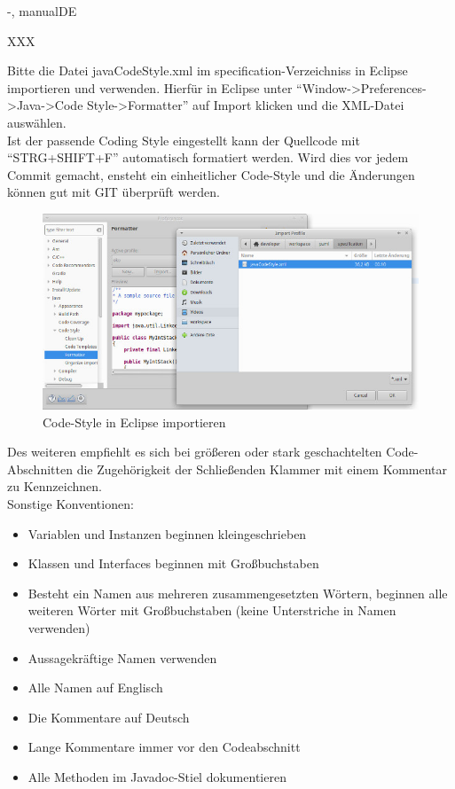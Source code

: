 \documentclass[twoside]{report}
\begin{document}
\begin{shownto}{-, manualDE}


XXX
\nsecend

Bitte die Datei javaCodeStyle.xml im specification-Verzeichniss in Eclipse importieren und verwenden.
Hierfür in Eclipse unter "`Window->Preferences->Java->Code Style->Formatter"' auf Import klicken und die XML-Datei auswählen.\\
Ist der passende Coding Style eingestellt kann der Quellcode mit "`STRG+SHIFT+F"' automatisch formatiert werden.
Wird dies vor jedem Commit gemacht, ensteht ein einheitlicher Code-Style und die Änderungen können gut mit GIT überprüft werden.\\
\begin{figure}[hbtp]
\centering
\includegraphics[scale=0.5]{Bilder/importCodeStyle}
\caption{Code-Style in Eclipse importieren}
\end{figure}
Des weiteren empfiehlt es sich bei größeren oder stark geschachtelten Code-Abschnitten die Zugehörigkeit der Schließenden Klammer mit einem Kommentar zu Kennzeichnen.\\
Sonstige Konventionen:
\begin{itemize}
\item{Variablen und Instanzen beginnen kleingeschrieben}
\item{Klassen und Interfaces beginnen mit Großbuchstaben}
\item{Besteht ein Namen aus mehreren zusammengesetzten Wörtern, beginnen alle weiteren Wörter mit Großbuchstaben (keine Unterstriche in Namen verwenden)}
\item{Aussagekräftige Namen verwenden}
\item{Alle Namen auf Englisch}
\item{Die Kommentare auf Deutsch}
\item{Lange Kommentare immer vor den Codeabschnitt}
\item{Alle Methoden im Javadoc-Stiel dokumentieren}
\end{itemize}


\end{shownto}
\end{document}

